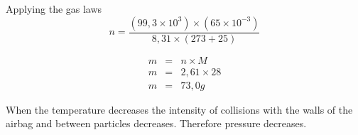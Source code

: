 \begin{wex}{Applying the gas laws\\}
{\begin{equation*}
n=\frac{(99,3 \times 10^3) \times (65 \times 10^{-3}) } {8,31 \times (273 + 25 ) }
\end{equation*}
}

{
\begin{eqnarray*}
m &=& n \times M\\
m &=& 2,61 \times 28\\
m &=& 73,0 g
\end{eqnarray*}
}

{

When the temperature decreases the intensity of collisions with the walls of the airbag and between particles decreases. Therefore pressure decreases.
}
\end{wex}



